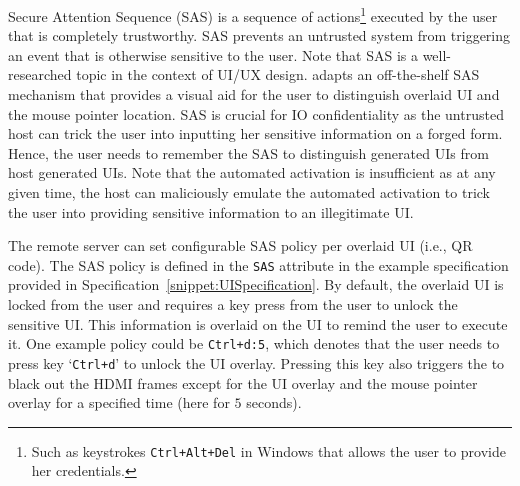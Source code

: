 Secure Attention Sequence (SAS) is a sequence of actions\footnote{Such as keystrokes \texttt{Ctrl+Alt+Del} in Windows that allows the user to provide her credentials.} executed by the user that is completely trustworthy. SAS prevents an untrusted system from triggering an event that is otherwise sensitive to the user. Note that SAS is a well-researched topic in the context of UI/UX design. \name adapts an off-the-shelf SAS mechanism that provides a visual aid for the user to distinguish overlaid UI and the mouse pointer location. SAS is crucial for IO confidentiality as the untrusted host can trick the user into inputting her sensitive information on a forged form. Hence, the user needs to remember the SAS to distinguish \device generated UIs from host generated UIs. Note that the automated activation is insufficient as at any given time, the host can maliciously emulate the automated activation to trick the user into providing sensitive information to an illegitimate UI. 

 The remote server can set configurable SAS policy per overlaid UI (i.e., QR code). The SAS policy is defined in the \texttt{SAS} attribute in the example specification provided in Specification~\ref{snippet:UISpecification}. By default, the overlaid UI is locked from the user and requires a key press from the user to unlock the sensitive UI. This information is overlaid on the UI to remind the user to execute it. One example policy could be \texttt{Ctrl+d:5}, which denotes that the user needs to press key `\texttt{Ctrl+d}' to unlock the UI overlay. Pressing this key also triggers the \device to black out the HDMI frames except for the UI overlay and the mouse pointer overlay for a specified time (here for $5$ seconds). 


